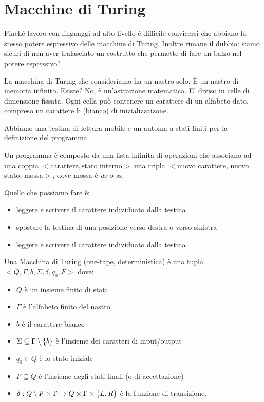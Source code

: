 \section{Macchine di Turing}

Finché lavoro con linguaggi ad alto livello è difficile convicersi che abbiano lo stesso potere
espressivo delle macchine di Turing. Inoltre rimane il dubbio: siamo sicuri di non aver tralasciato
un costrutto che permette di fare un balzo nel potere espressivo?

La macchina di Turing che consideriamo ha un nastro solo. È un nastro di memoria infinito. Esiste?
No, è un'astrazione matematica. E' diviso in celle di dimensione fissata. Ogni cella può contenere
un carattere di un alfabeto dato, compreso un carattere b (bianco) di inizializzaizone.

Abbiamo una testina di lettura mobile e un automa a stati finiti per la definizione del programma.

Un programma è composto da una lista infinita di operazioni che associano ad una coppia
$<\text{carattere},\text{stato interno}>$ una tripla $<$nuovo carattere, nuovo stato,
mossa$>$, dove mossa è \textit{dx} o \textit{sx}.

Quello che possiamo fare è:
\begin{itemize}
    \item leggere e scrivere il carattere individuato dalla testina
    \item spostare la testina di una posizione verso destra o verso sinistra
    \item leggere e scrivere il carattere individuato dalla testina
\end{itemize}

Una Macchina di Turing (one-tape, deterministica) è una tupla $<Q,\Gamma,b,\Sigma,\delta,q_{0},F>$
dove:
\begin{itemize}
    \item $Q$ è un insieme finito di stati
    \item $\Gamma$ è l'alfabeto finito del nastro
    \item $b$ è il carattere bianco
    \item $\Sigma \subseteq \Gamma \setminus \{b\}$ è l'insieme dei caratteri di input/output
    \item $q_{0} \in Q$ è lo stato iniziale
    \item $F \subseteq Q$ è l'insieme degli stati finali (o di accettazione)
    \item $\delta: Q \setminus F \times \Gamma \to Q \times \Gamma \times \{L,R\}$ è la funzione di transizione.
\end{itemize}

